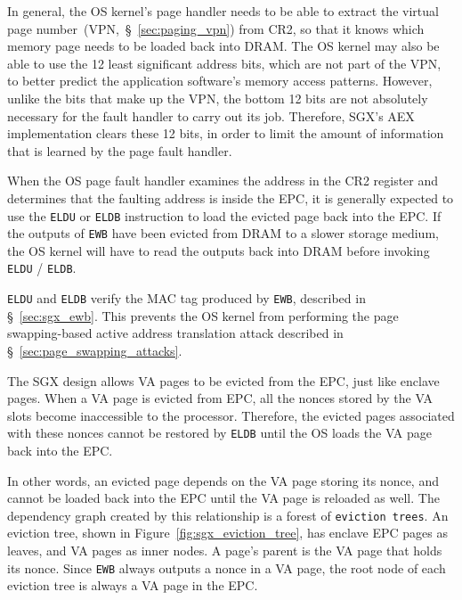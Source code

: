 In general, the OS kernel's page handler needs to be able to extract the
virtual page number~(VPN,~\S~\ref{sec:paging_vpn}) from CR2, so that it knows
which memory page needs to be loaded back into DRAM. The OS kernel may also be
able to use the 12 least significant address bits, which are not part of the
VPN, to better predict the application software's memory access patterns.
However, unlike the bits that make up the VPN, the bottom 12 bits are not
absolutely necessary for the fault handler to carry out its job. Therefore,
SGX's AEX implementation clears these 12 bits, in order to limit the amount of
information that is learned by the page fault handler.


When the OS page fault handler examines the address in the CR2 register and
determines that the faulting address is inside the EPC, it is generally
expected to use the \texttt{ELDU} or \texttt{ELDB} instruction to load the
evicted page back into the EPC. If the outputs of \texttt{EWB} have been
evicted from DRAM to a slower storage medium, the OS kernel will have to read
the outputs back into DRAM before invoking \texttt{ELDU} / \texttt{ELDB}.

\texttt{ELDU} and \texttt{ELDB} verify the MAC tag produced by \texttt{EWB},
described in \S~\ref{sec:sgx_ewb}. This prevents the OS kernel from performing
the page swapping-based active address translation attack described in
\S~\ref{sec:page_swapping_attacks}.


\label{sec:sgx_eviction_trees}

The SGX design allows VA pages to be evicted from the EPC, just like enclave
pages. When a VA page is evicted from EPC, all the nonces stored by the VA
slots become inaccessible to the processor. Therefore, the evicted pages
associated with these nonces cannot be restored by \texttt{ELDB} until the
OS loads the VA page back into the EPC.

In other words, an evicted page depends on the VA page storing its nonce, and
cannot be loaded back into the EPC until the VA page is reloaded as well.
The dependency graph created by this relationship is a forest of
\texttt{eviction trees}. An eviction tree, shown in
Figure~\ref{fig:sgx_eviction_tree}, has enclave EPC pages as leaves, and VA
pages as inner nodes. A page's parent is the VA page that holds its nonce.
Since \texttt{EWB} always outputs a nonce in a VA page, the root node of each
eviction tree is always a VA page in the EPC.

